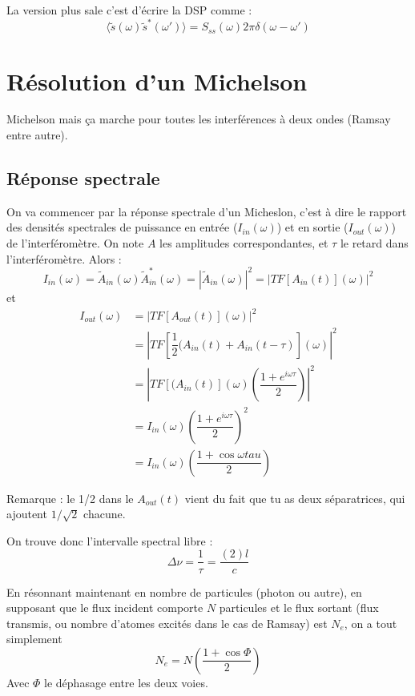 \documentclass[a4paper]{report}
\begin{document}
 La version plus sale c'est d'écrire la DSP comme :
 \begin{equation}
 \langle \tilde{s}(\omega) \tilde{s}^*(\omega') \rangle = S_{ss}(\omega)2\pi  \delta(\omega-\omega')
 \end{equation}
 
 \section{Résolution d'un Michelson}
 Michelson mais ça marche pour toutes les interférences à deux ondes (Ramsay entre autre).
 
 \subsection{Réponse spectrale}
 On va commencer par la réponse spectrale d'un Micheslon, c'est à dire le rapport des densités spectrales de puissance en entrée ($I_{in}(\omega)$) et en sortie ($I_{out}(\omega)$) de l'interféromètre. On note $A$ les amplitudes correspondantes, et $\tau$ le retard dans l'interféromètre. Alors :
 \begin{equation}
 I_{in}(\omega)=\tilde{A}_{in}(\omega)\tilde{A}_{in}^*(\omega)=|\tilde{A}_{in}(\omega)|^2=|TF[A_{in}(t)](\omega)|^2
 \end{equation}
 et 
 \begin{align*}
I_{out}(\omega)&= |TF[A_{out}(t)](\omega)|^2 \\
 &= |TF[\dfrac{1}{2} (A_{in}(t)+A_{in}(t-\tau)](\omega)|^2 \\
 &= \left|TF[(A_{in}(t)](\omega)\left(\dfrac{1+e^{i\omega \tau}}{2}\right)\right|^2 \\
 &= I_{in}(\omega) \left(\dfrac{1+e^{i\omega \tau}}{2}\right)^2 \\
 &= I_{in}(\omega) \left(\dfrac{1+\cos \omega tau}{2}\right)
 \end{align*}
 
 Remarque : le 1/2 dans le $A_{out}(t)$ vient du fait que tu as deux séparatrices, qui ajoutent $1/\sqrt{2}$ chacune.
 
 On trouve donc l'intervalle spectral libre : \begin{equation}
 \Delta \nu = \dfrac{1}{\tau} = \dfrac{(2)l}{c}
 \end{equation}
 
 En résonnant maintenant en nombre de particules (photon ou autre), en supposant que le flux incident comporte $N$ particules et le flux sortant (flux transmis, ou nombre d'atomes excités dans le cas de Ramsay) est $N_e$, on a tout simplement \begin{equation}
 N_e=N\left(\dfrac{1+\cos \Phi}{2}\right)
 \end{equation}
Avec $\Phi$ le déphasage entre les deux voies.
\end{document}
